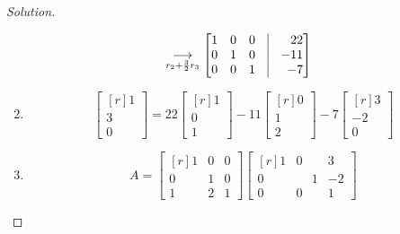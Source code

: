 \documentclass[oneside]{book}
\theoremstyle{mystyle}
\begin{document}
\begin{proof}[Solution]
\begin{enumerate}
\begin{align*}
        &\underset{r_{2}+\frac{3}{2}r_{3}}{\longrightarrow} \begin{bmatrix*}[r] 1 & 0 & 0 & \vline & 22 \\ 0 & 1 & 0 & \vline & -11 \\ 0 & 0 & 1 & \vline & -7 \end{bmatrix*}
    \end{align*}
    \item
    \begin{equation*}
        \begin{bmatrix*}[r] 1 \\ 3 \\ 0 \end{bmatrix*} = 22 \begin{bmatrix*}[r] 1 \\ 0 \\ 1 \end{bmatrix*} - 11\begin{bmatrix*}[r] 0 \\ 1 \\ 2 \end{bmatrix*} -7 \begin{bmatrix*}[r] 3 \\ -2 \\ 0 \end{bmatrix*}
    \end{equation*}
    \item
    \begin{equation*}
        A = \begin{bmatrix*}[r] 1 & 0 & 0 \\ 0 & 1 & 0 \\ 1 & 2 & 1 \end{bmatrix*} \begin{bmatrix*}[r] 1 & 0 & 3 \\ 0 & \phantom{-}1 & -2 \\ 0 & 0 & 1 \end{bmatrix*}
    \end{equation*}
\end{enumerate}
\end{proof} 
\end{document}
